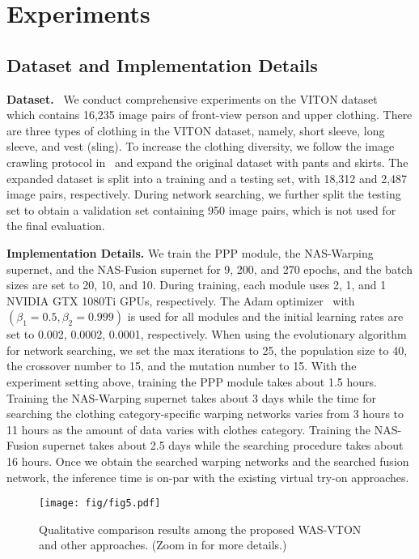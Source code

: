 \documentclass[sigconf]{acmart}
\begin{document}
\section{Experiments}
\subsection{Dataset and Implementation Details}
\noindent\textbf{Dataset.}~\label{sec:dataset} 
We conduct comprehensive experiments on the VITON dataset~\cite{xintong2018viton} which contains 16,235 image pairs of front-view person and upper clothing. There are three types of clothing in the VITON dataset, namely, short sleeve, long sleeve, and vest (sling). To increase the clothing diversity, we follow the image crawling protocol in~\cite{xintong2018viton} and expand the original dataset with pants and skirts. The expanded dataset is split into a training and a testing set, with 18,312 and 2,487 image pairs, respectively. 
During network searching, we further split the testing set to obtain a validation set containing 950 image pairs, which is not used for the final evaluation. 

\noindent\textbf{Implementation Details.} 
We train the PPP module, the NAS-Warping supernet, and the NAS-Fusion supernet for 9, 200, and 270 epochs, and the batch sizes are set to 20, 10, and 10. During training, each module uses 2, 1, and 1 NVIDIA GTX 1080Ti GPUs, respectively. The Adam optimizer~\cite{Kingma2014adam}  with $(\beta_1 = 0.5, \beta_2 = 0.999)$ is used for all modules and the initial learning rates are set to 0.002, 0.0002, 0.0001, respectively. When using the evolutionary algorithm for network searching, we set the max iterations to 25, the population size to 40, the crossover number to 15, and the mutation number to 15.
With the experiment setting above, training the PPP module takes about 1.5 hours. Training the NAS-Warping supernet takes about 3 days while the time for searching the clothing category-specific warping networks varies from 3 hours to 11 hours as the amount of data varies with clothes category. Training the NAS-Fusion supernet takes about 2.5 days while the searching procedure takes about 16 hours. Once we obtain the searched warping networks and the searched fusion network, the inference time is on-par with the existing virtual try-on approaches.

\begin{figure*}[t]
  \centering
  \texttt{[image: fig/fig5.pdf]}
  \vspace{-8mm}
  \caption{Qualitative comparison results among the proposed WAS-VTON and other approaches. (Zoom in for more details.) }
  \vspace{-4mm}
  \label{fig:fig4}
\end{figure*}
\end{document}
